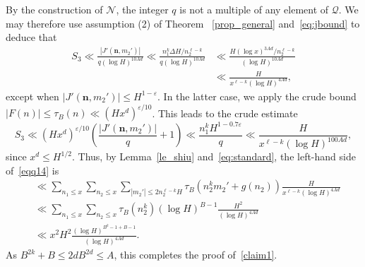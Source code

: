 \documentclass[11pt,letterpaper]{amsart}
\renewcommand{\leq}{\leqslant}
\theoremstyle{definition}
\numberwithin{equation}{section}
\newcommand{\0}{\mathbf{0}}
\begin{document}
By the construction of $\mathcal N$, the integer $q$ is not a multiple of any element of $\mathcal Q$. We may  therefore use   assumption (2) of Theorem ~\ref{prop_general} and~\eqref{eq:jbound}
 to deduce that 
  \begin{align*}
  S_3
  \ll \frac{ |J'(\mathbf n,m_2')|}{q (\log H )^{10Ad}}  
\ll  \frac{ n_1^k \Delta H/n_2^{\ell-k}}{q (\log H )^{10Ad}} 
&\ll \frac{   H (\log x)^{3Ad}/n_2^{\ell-k}}{ (\log H )^{10Ad}} \\
&\ll  \frac{   H }{x^{\ell-k}  (\log H )^{4Ad}} 
 ,  
 \end{align*}
 except when $|J'(\mathbf n,m_2')|\leq H^{1-\varepsilon}$. In the latter case, we apply  the crude bound 
 $|F(n)|\leq \tau_B(n)\ll (Hx^d)^{\varepsilon/10} $. This leads to the crude estimate
$$
S_3\ll (Hx^d)^{\varepsilon/10}  \left(\frac{|J'(\mathbf n,m_2')|}{q}+1\right) \ll \frac{n_1^k H^{1-0.7\varepsilon}}{q}
\ll \frac{ H}{ x^{\ell-k}  (\log H)^{ 100Ad}}
,$$
since $x^{d}\leq H^{1/2}$.
Thus, by Lemma~\ref{le_shiu} and~\eqref{eq:standard}, the left-hand side of~\eqref{eqq14} is 
\begin{align*}  
&\ll \sum_{n_1\leq x}\sum_{n_2\leq x} \sum_{|m_2'|\leq 2n_2^{\ell-k}H}\tau_{B}(n_2^km_2'+g(n_2))
   \frac{ H}{x^{\ell-k}  (\log H)^{4Ad}}\\
   &\ll \sum_{n_1\leq x}\sum_{n_2\leq x}\tau_B(n_2^k)(\log H)^{B-1}\frac{H^2}{(\log H)^{4Ad}}\\
&\ll x^2H^2   \frac{ (\log H)^{B^k-1+B-1}   }{     (\log H)^{ 4Ad}}. \end{align*}
 As $B^{2k}+B\leq 2dB^{2d}\leq A$, this completes the proof of~\eqref{claim1}. 
 
\end{document}
